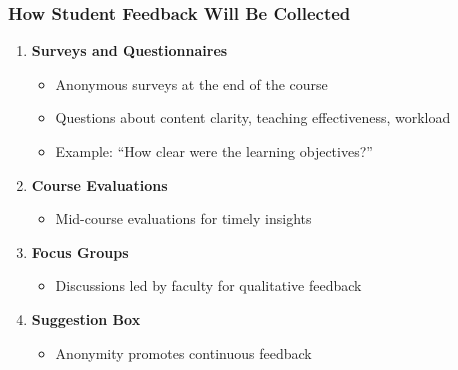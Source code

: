 \documentclass[aspectratio=169]{beamer}
\begin{document}
\begin{frame}[fragile]
    \frametitle{How Student Feedback Will Be Collected}
    
    \begin{enumerate}
        \item \textbf{Surveys and Questionnaires}
        \begin{itemize}
            \item Anonymous surveys at the end of the course
            \item Questions about content clarity, teaching effectiveness, workload
            \item Example: ``How clear were the learning objectives?''
        \end{itemize}
        
        \item \textbf{Course Evaluations}
        \begin{itemize}
            \item Mid-course evaluations for timely insights
        \end{itemize}
        
        \item \textbf{Focus Groups}
        \begin{itemize}
            \item Discussions led by faculty for qualitative feedback
        \end{itemize}
        
        \item \textbf{Suggestion Box}
        \begin{itemize}
            \item Anonymity promotes continuous feedback
        \end{itemize}
    \end{enumerate}
\end{frame}
\end{document}
